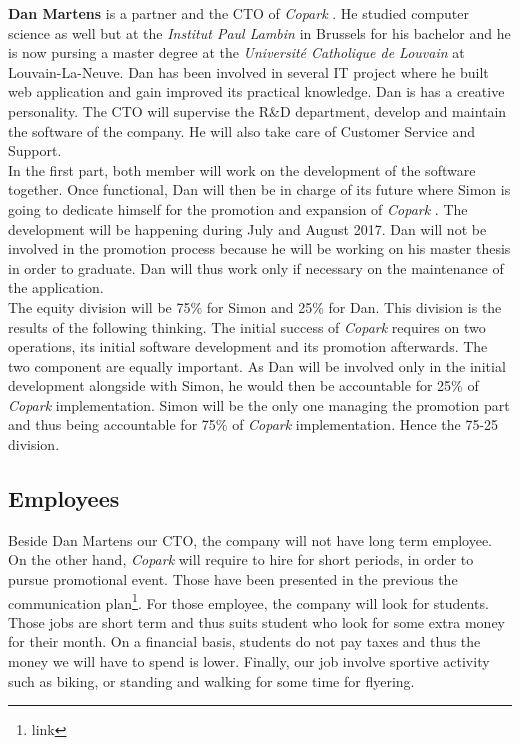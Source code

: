 \documentclass[12pt,a4paper,oneside]{book}
\newcommand{\bp}{\textit{Copark }}
\begin{document}
\textbf{Dan Martens} is a partner and the CTO of \bp. He studied computer science as well but at the \textit{Institut Paul Lambin} in Brussels for his bachelor and he is now pursing a master degree at the \textit{Université Catholique de Louvain} at Louvain-La-Neuve. Dan has been involved in several IT project where he built web application and gain improved its practical knowledge. Dan is has a creative personality. The CTO will supervise the R\&D department, develop and maintain the software of the company. He will also take care of Customer Service and Support.\\

In the first part, both member will work on the development of the software together. Once functional, Dan will then be in charge of its future where Simon is going to dedicate himself for the promotion and expansion of \bp. The development will be happening during July and August 2017. Dan will not be involved in the promotion process because he will be working on his master thesis in order to graduate. Dan will thus work only if necessary on the maintenance of the application.\\

The equity division will be 75\% for Simon and 25\% for Dan. This division is the results of the following thinking. The initial success of \bp requires on two operations, its initial software development and its promotion afterwards. The two component are equally important. As Dan will be involved only in the initial development alongside with Simon, he would then be accountable for 25\% of \bp implementation. Simon will be the only one managing the promotion part and thus being accountable for 75\% of \bp implementation. Hence the 75-25 division.

\subsection{Employees}

Beside Dan Martens our CTO, the company will not have long term employee. On the other hand, \bp will require to hire for short periods, in order to pursue promotional event. Those have been presented in the previous the communication plan\footnote{link}. For those employee, the company will look for students. Those jobs are short term and thus suits student who look for some extra money for their month. On a financial basis, students do not pay taxes and thus the money we will have to spend is lower. Finally, our job involve sportive activity such as biking, or standing and walking for some time for flyering.
\end{document}

